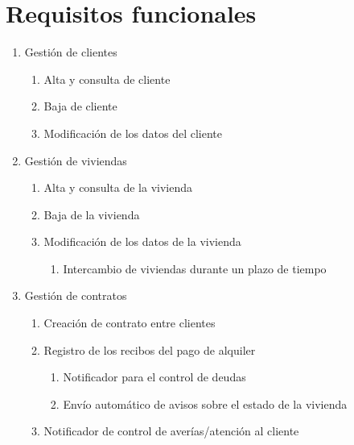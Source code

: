 \section{Requisitos funcionales}
\begin{enumerate}
\item Gestión de clientes
	\begin{enumerate}[RF-i.1]
	\item Alta y consulta de cliente
	\item Baja de cliente
	\item Modificación de los datos del cliente
	\end{enumerate}
\item Gestión de viviendas
	\begin{enumerate}[RF-i.1]
	\item Alta y consulta de la vivienda
	\item Baja de la vivienda
	\item Modificación de los datos de la vivienda
		\begin{enumerate}[RF-2.3.1]
		\item Intercambio de viviendas durante un plazo de tiempo
		\end{enumerate}
	\end{enumerate}
\item Gestión de contratos
	\begin{enumerate}[RF-i.1]
	\item Creación de contrato entre clientes
	\item Registro de los recibos del pago de alquiler
		\begin{enumerate}[RF-3.2.1]
		\item Notificador para el control de deudas
		\item Envío automático de avisos sobre el estado de la vivienda
		\end{enumerate}
	\item Notificador de control de averías/atención al cliente
	\end{enumerate}
\end{enumerate}